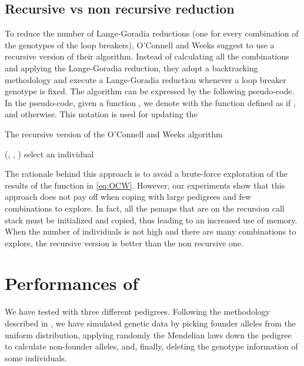 \subsection{Recursive vs non recursive reduction}
\label{sec:recursive-vs-non}
To reduce the number of Lange-Goradia reductions (one for every combination of
the genotypes of the loop breakers), O'Connell and Weeks suggest to use a
recursive version of their algorithm. Instead of calculating all the
combinations and applying the Lange-Goradia reduction, they adopt a backtracking
methodology and execute a Lange-Goradia reduction whenever a loop breaker
genotype is fixed. The algorithm can be
expressed by the following pseudo-code. In the pseudo-code, given a function , we denote with  the
function  defined as  if , and  otherwise. This notation is used for updating the  
\begin{algorithm}
  \caption{The recursive version of the O'Connell and Weeks algorithm}
  \begin{algorithmic}[1]
    \STATE (, , ) 
    \IF{} 
    \RETURN  
    \ELSE 
       \STATE  
       \STATE select an individual  
       \FOR{}
           \STATE  
           \STATE 
       \ENDFOR
       \RETURN 
    \ENDIF
  \end{algorithmic}
\end{algorithm}
The rationale behind this approach is to avoid a brute-force exploration of the
results of the  function in \eqref{eq:OCW}. However, our experiments
show that this approach does not pay off when coping with large pedigrees and
few combinations to explore. In fact, all the psmaps that are on the recursion
call stack must be initialized and copied, thus leading to an increased use of
memory. When the number of individuals is not high and there are many
combinations to explore, the recursive version is better than the non recursive
one.


\section{Performances of {}}
\label{sec:performances-thetool}

We have tested {\TheTool} with three different pedigrees. Following the
methodology described in \cite{Pirinen2006}, we have simulated genetic data by
picking founder alleles from the uniform distribution, applying randomly
the Mendelian laws down the pedigree to calculate non-founder alleles, and,
finally, deleting the genotype information of some individuals. 

